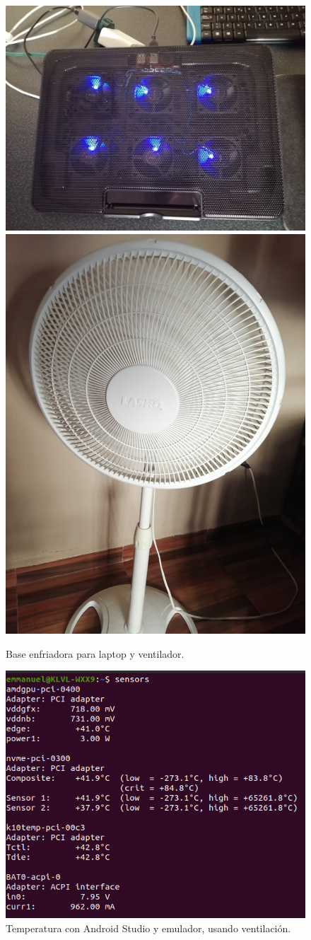 \documentclass{article}
\begin{document}
\begin{figure}[htbp]

\center

\includegraphics[width=0.45\linewidth]{imagenes/placa}
\includegraphics[width=0.45\linewidth]{imagenes/ventilador}

\caption{Base enfriadora para laptop y ventilador.} \label{fig:ventiladores}

\end{figure}

\begin{figure}[htbp]

\center

\includegraphics[scale=0.5]{imagenes/temp3}

\caption{Temperatura con Android Studio y emulador, usando ventilación.} \label{fig:temp3}

\end{figure}
\end{document}
